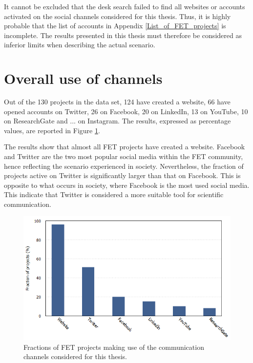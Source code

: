 It cannot be excluded that the desk search failed to find all websites or accounts activated on the social channels considered for this thesis. Thus, it is highly probable that the list of accounts in Appendix \ref{List_of_FET_projects} is incomplete. The results presented in this thesis must therefore be considered as inferior limits when describing the actual scenario. 

\section{Overall use of channels} \label{Overall_use_of_channels}
Out of the 130 projects in the data set, 124 have created a website, 66 have opened accounts on Twitter, 26 on Facebook, 20 on  LinkedIn, 13 on YouTube, 10 on ResearchGate and ... on Instagram. The results, expressed as percentage values, are reported in Figure \ref{Social_media}.

The results show that almost all FET projects have created a website. Facebook and Twitter are the two most popular social media within the FET community, hence reflecting the scenario experienced in society. Nevertheless, the fraction of projects active on Twitter is significantly larger than that on Facebook. This is opposite to what occurs in society, where Facebook is the most used social media. This indicate that Twitter is considered a more suitable tool for scientific communication. 

\begin{figure}[!t] 
 \begin{center}
 \includegraphics[scale=0.4]{Images/Social_media.png}
 \caption{Fractions of FET projects making use of the communication channels considered for this thesis.}
 \label{Social_media}
 \end{center}
\end{figure}

